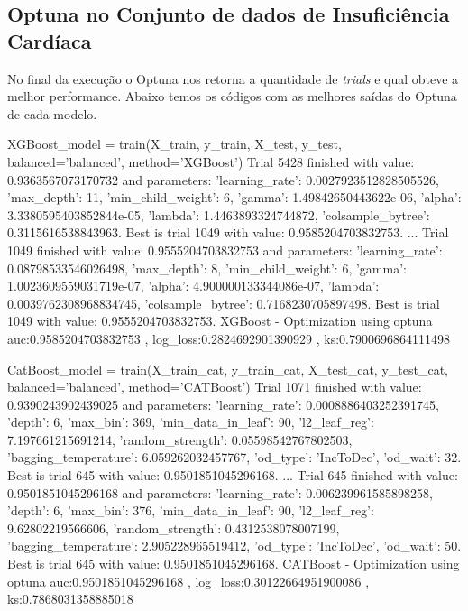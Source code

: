 \subsection{Optuna no Conjunto de dados de Insuficiência Cardíaca}
No final da execução o Optuna nos retorna a quantidade de \textit{trials} e qual obteve a melhor performance. Abaixo temos os códigos com as melhores saídas do Optuna de cada modelo.
\begin{codigo}[caption={Resultado do Optuna no conjunto de dados de Insuficiência Cardíaca.}, label={codigo:res:op:dia}, language=Python, breaklines=true]
XGBoost_model = train(X_train, y_train, X_test, y_test, balanced='balanced', method='XGBoost')
Trial 5428 finished with value: 0.9363567073170732 and parameters: {'learning_rate': 0.0027923512828505526, 'max_depth': 11, 'min_child_weight': 6, 'gamma': 1.49842650443622e-06, 'alpha': 3.3380595403852844e-05, 'lambda': 1.4463893324744872, 'colsample_bytree': 0.3115616538843963}. Best is trial 1049 with value: 0.9585204703832753.
...
Trial 1049 finished with value: 0.9555204703832753 and parameters: {'learning_rate': 0.08798533546026498, 'max_depth': 8, 'min_child_weight': 6, 'gamma': 1.0023609559031719e-07, 'alpha': 4.900000133344086e-07, 'lambda': 0.0039762308968834745, 'colsample_bytree': 0.7168230705897498}. Best is trial 1049 with value: 0.9555204703832753.
XGBoost - Optimization using optuna
auc:0.9585204703832753 , log_loss:0.2824692901390929 , ks:0.7900696864111498

CatBoost_model = train(X_train_cat, y_train_cat, X_test_cat, y_test_cat, balanced='balanced', method='CATBoost')
Trial 1071 finished with value: 0.9390243902439025 and parameters: {'learning_rate': 0.0008886403252391745, 'depth': 6, 'max_bin': 369, 'min_data_in_leaf': 90, 'l2_leaf_reg': 7.197661215691214, 'random_strength': 0.05598542767802503, 'bagging_temperature': 6.059262032457767, 'od_type': 'IncToDec', 'od_wait': 32}. Best is trial 645 with value: 0.9501851045296168.
...
Trial 645 finished with value: 0.9501851045296168 and parameters: {'learning_rate': 0.006239961585898258, 'depth': 6, 'max_bin': 376, 'min_data_in_leaf': 90, 'l2_leaf_reg': 9.62802219566606, 'random_strength': 0.4312538078007199, 'bagging_temperature': 2.905228965519412, 'od_type': 'IncToDec', 'od_wait': 50}. Best is trial 645 with value: 0.9501851045296168.
CATBoost - Optimization using optuna
auc:0.9501851045296168 , log_loss:0.30122664951900086 , ks:0.7868031358885018


\end{codigo}
